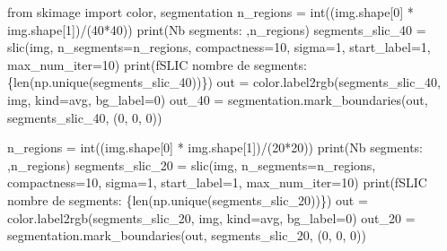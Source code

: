 \documentclass[
  french,
  11pt,
  letterpaper,
  open=any,
  twoside=false,
  french]{scrbook}
\newenvironment{Shaded}{\begin{snugshade}}{\end{snugshade}}
\newcommand{\BuiltInTok}[1]{\textcolor[rgb]{0.00,0.23,0.31}{#1}}
\newcommand{\DecValTok}[1]{\textcolor[rgb]{0.68,0.00,0.00}{#1}}
\newcommand{\ImportTok}[1]{\textcolor[rgb]{0.00,0.46,0.62}{#1}}
\newcommand{\NormalTok}[1]{\textcolor[rgb]{0.00,0.23,0.31}{#1}}
\newcommand{\OperatorTok}[1]{\textcolor[rgb]{0.37,0.37,0.37}{#1}}
\newcommand{\SpecialCharTok}[1]{\textcolor[rgb]{0.37,0.37,0.37}{#1}}
\newcommand{\SpecialStringTok}[1]{\textcolor[rgb]{0.13,0.47,0.30}{#1}}
\newcommand{\StringTok}[1]{\textcolor[rgb]{0.13,0.47,0.30}{#1}}
\begin{document}
\begin{Shaded}
\begin{Highlighting}[]
\ImportTok{from}\NormalTok{ skimage }\ImportTok{import}\NormalTok{ color, segmentation}
\NormalTok{n\_regions }\OperatorTok{=} \BuiltInTok{int}\NormalTok{((img.shape[}\DecValTok{0}\NormalTok{] }\OperatorTok{*}\NormalTok{ img.shape[}\DecValTok{1}\NormalTok{])}\OperatorTok{/}\NormalTok{(}\DecValTok{40}\OperatorTok{*}\DecValTok{40}\NormalTok{))}
\BuiltInTok{print}\NormalTok{(}\StringTok{\textquotesingle{}Nb segments: \textquotesingle{}}\NormalTok{,n\_regions)}
\NormalTok{segments\_slic\_40 }\OperatorTok{=}\NormalTok{ slic(img, n\_segments}\OperatorTok{=}\NormalTok{n\_regions, compactness}\OperatorTok{=}\DecValTok{10}\NormalTok{, sigma}\OperatorTok{=}\DecValTok{1}\NormalTok{, start\_label}\OperatorTok{=}\DecValTok{1}\NormalTok{, max\_num\_iter}\OperatorTok{=}\DecValTok{10}\NormalTok{)}
\BuiltInTok{print}\NormalTok{(}\SpecialStringTok{f\textquotesingle{}SLIC nombre de segments: }\SpecialCharTok{\{}\BuiltInTok{len}\NormalTok{(np.unique(segments\_slic\_40))}\SpecialCharTok{\}}\SpecialStringTok{\textquotesingle{}}\NormalTok{)}
\NormalTok{out }\OperatorTok{=}\NormalTok{ color.label2rgb(segments\_slic\_40, img, kind}\OperatorTok{=}\StringTok{\textquotesingle{}avg\textquotesingle{}}\NormalTok{, bg\_label}\OperatorTok{=}\DecValTok{0}\NormalTok{)}
\NormalTok{out\_40 }\OperatorTok{=}\NormalTok{ segmentation.mark\_boundaries(out, segments\_slic\_40, (}\DecValTok{0}\NormalTok{, }\DecValTok{0}\NormalTok{, }\DecValTok{0}\NormalTok{))}

\NormalTok{n\_regions }\OperatorTok{=} \BuiltInTok{int}\NormalTok{((img.shape[}\DecValTok{0}\NormalTok{] }\OperatorTok{*}\NormalTok{ img.shape[}\DecValTok{1}\NormalTok{])}\OperatorTok{/}\NormalTok{(}\DecValTok{20}\OperatorTok{*}\DecValTok{20}\NormalTok{))}
\BuiltInTok{print}\NormalTok{(}\StringTok{\textquotesingle{}Nb segments: \textquotesingle{}}\NormalTok{,n\_regions)}
\NormalTok{segments\_slic\_20 }\OperatorTok{=}\NormalTok{ slic(img, n\_segments}\OperatorTok{=}\NormalTok{n\_regions, compactness}\OperatorTok{=}\DecValTok{10}\NormalTok{, sigma}\OperatorTok{=}\DecValTok{1}\NormalTok{, start\_label}\OperatorTok{=}\DecValTok{1}\NormalTok{, max\_num\_iter}\OperatorTok{=}\DecValTok{10}\NormalTok{)}
\BuiltInTok{print}\NormalTok{(}\SpecialStringTok{f\textquotesingle{}SLIC nombre de segments: }\SpecialCharTok{\{}\BuiltInTok{len}\NormalTok{(np.unique(segments\_slic\_20))}\SpecialCharTok{\}}\SpecialStringTok{\textquotesingle{}}\NormalTok{)}
\NormalTok{out }\OperatorTok{=}\NormalTok{ color.label2rgb(segments\_slic\_20, img, kind}\OperatorTok{=}\StringTok{\textquotesingle{}avg\textquotesingle{}}\NormalTok{, bg\_label}\OperatorTok{=}\DecValTok{0}\NormalTok{)}
\NormalTok{out\_20 }\OperatorTok{=}\NormalTok{ segmentation.mark\_boundaries(out, segments\_slic\_20, (}\DecValTok{0}\NormalTok{, }\DecValTok{0}\NormalTok{, }\DecValTok{0}\NormalTok{))}


\end{Highlighting}
\end{Shaded}
\end{document}
